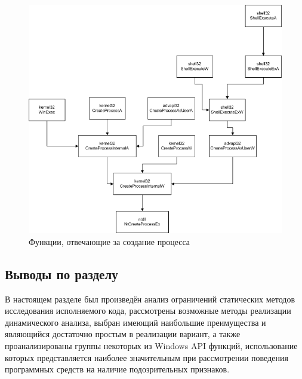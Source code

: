 \begin {figure}[h]
	\centering
	\includegraphics[width=\linewidth]{img/ExampleProcessCreateAPIs.png}
	\caption{Функции, отвечающие за создание процесса}
	\label{fig:createprocess}
\end {figure}
\subsection {Выводы по разделу}
В настоящем разделе был произведён анализ ограничений статических методов исследования исполняемого кода, рассмотрены возможные методы реализации динамического анализа, выбран имеющий наибольшие преимущества и являющийся достаточно простым в реализации вариант, а также проанализированы группы некоторых из Windows API функций, использование которых представляется наиболее значительным при рассмотрении поведения программных средств на наличие подозрительных признаков.